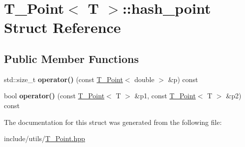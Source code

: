 \hypertarget{structPoint_1_1hash__point}{}\section{T_Point$<$ T $>$\+:\+:hash\+\_\+point Struct Reference}
\label{structPoint_1_1hash__point}
\subsection*{Public Member Functions}
\begin{DoxyCompactItemize}
\item 
\mbox{\label{structPoint_1_1hash__point_a7d05b1d732eaee94eb6f1b75dccf8bea}} 
std\+::size\+\_\+t {\bfseries operator()} (const \hyperlink{classPoint}{T_Point}$<$ double $>$ \&p) const
\item 
\mbox{\label{structPoint_1_1hash__point_a17bb0549df4147455615803d80be6745}} 
bool {\bfseries operator()} (const \hyperlink{classPoint}{T_Point}$<$ T $>$ \&p1, const \hyperlink{classPoint}{T_Point}$<$ T $>$ \&p2) const
\end{DoxyCompactItemize}


The documentation for this struct was generated from the following file\+:\begin{DoxyCompactItemize}
\item 
include/utils/\hyperlink{Point_8hpp}{T_Point.\+hpp}\end{DoxyCompactItemize}
